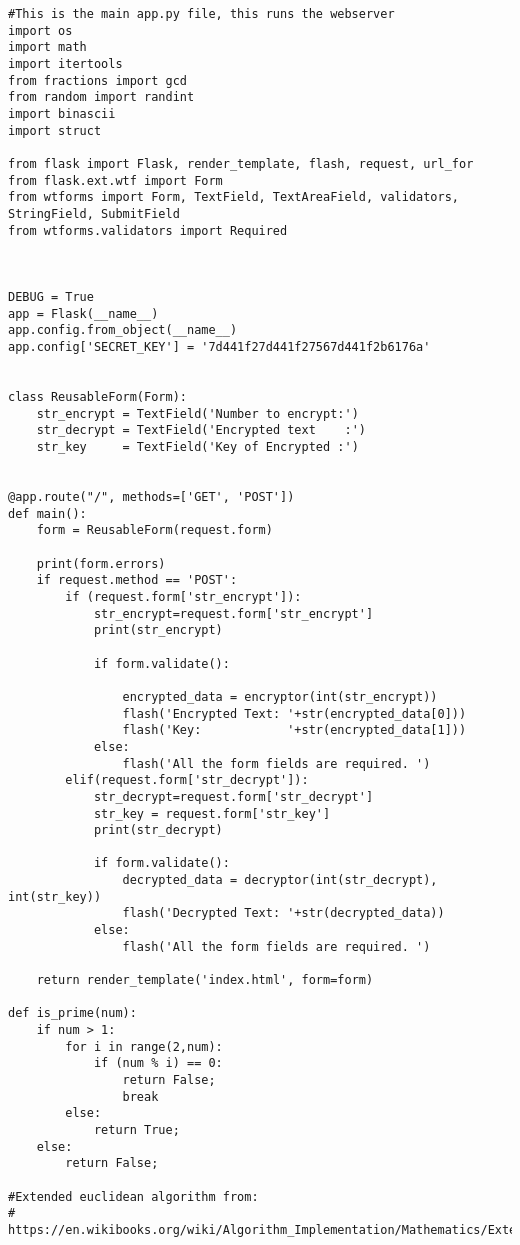 \documentclass[a4paper]{article}
\begin{document}
\begin{verbatim}
#This is the main app.py file, this runs the webserver
import os
import math
import itertools
from fractions import gcd
from random import randint
import binascii
import struct

from flask import Flask, render_template, flash, request, url_for
from flask.ext.wtf import Form
from wtforms import Form, TextField, TextAreaField, validators, StringField, SubmitField
from wtforms.validators import Required



DEBUG = True
app = Flask(__name__)
app.config.from_object(__name__)
app.config['SECRET_KEY'] = '7d441f27d441f27567d441f2b6176a'
 

class ReusableForm(Form):
    str_encrypt = TextField('Number to encrypt:')
    str_decrypt = TextField('Encrypted text    :')
    str_key     = TextField('Key of Encrypted :')


@app.route("/", methods=['GET', 'POST'])
def main():
    form = ReusableForm(request.form)
 
    print(form.errors)
    if request.method == 'POST':
        if (request.form['str_encrypt']):
            str_encrypt=request.form['str_encrypt']
            print(str_encrypt)
     
            if form.validate():

                encrypted_data = encryptor(int(str_encrypt))
                flash('Encrypted Text: '+str(encrypted_data[0]))
                flash('Key:            '+str(encrypted_data[1]))
            else:
                flash('All the form fields are required. ')
        elif(request.form['str_decrypt']):
            str_decrypt=request.form['str_decrypt']
            str_key = request.form['str_key']
            print(str_decrypt)
     
            if form.validate():
                decrypted_data = decryptor(int(str_decrypt), int(str_key))
                flash('Decrypted Text: '+str(decrypted_data))
            else:
                flash('All the form fields are required. ')             
 
    return render_template('index.html', form=form)

def is_prime(num):
    if num > 1:
        for i in range(2,num):
            if (num % i) == 0:
                return False;
                break
        else:
            return True;
    else:
        return False;

#Extended euclidean algorithm from:
# https://en.wikibooks.org/wiki/Algorithm_Implementation/Mathematics/Extended_Euclidean_algorithm


\end{verbatim}
\end{document}
